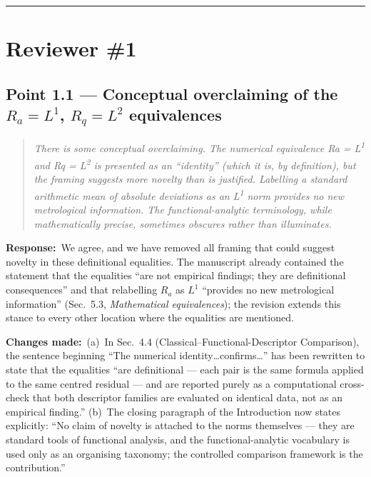 \documentclass[11pt,a4paper]{article}
\newenvironment{reviewercomment}%
{\par\medskip\noindent\begin{quotation}\itshape\color{black!70}}%
{\end{quotation}\medskip}
\newcommand{\response}{\par\noindent\textbf{Response:}\ }
\newcommand{\changes}{\par\noindent\textbf{Changes made:}\ }
\begin{document}
\bigskip
\hrule
\section*{Reviewer \#1}

\subsection*{Point 1.1 --- Conceptual overclaiming of the $R_a = L^1$, $R_q = L^2$ equivalences}
\begin{reviewercomment}
There is some conceptual overclaiming. The numerical equivalence Ra = L\textsuperscript{1} and Rq = L\textsuperscript{2} is presented as an ``identity'' (which it is, by definition), but the framing suggests more novelty than is justified. Labelling a standard arithmetic mean of absolute deviations as an L\textsuperscript{1} norm provides no new metrological information. The functional-analytic terminology, while mathematically precise, sometimes obscures rather than illuminates.
\end{reviewercomment}
\response We agree, and we have removed all framing that could suggest novelty in these definitional equalities. The manuscript already contained the statement that the equalities ``are not empirical findings; they are definitional consequences'' and that relabelling $R_a$ as $L^1$ ``provides no new metrological information'' (Sec.~5.3, \emph{Mathematical equivalences}); the revision extends this stance to every other location where the equalities are mentioned.
\changes (a)~In Sec.~4.4 (Classical--Functional-Descriptor Comparison), the sentence beginning ``The numerical identity\ldots confirms\ldots'' has been rewritten to state that the equalities ``are definitional --- each pair is the same formula applied to the same centred residual --- and are reported purely as a computational cross-check that both descriptor families are evaluated on identical data, not as an empirical finding.'' (b)~The closing paragraph of the Introduction now states explicitly: ``No claim of novelty is attached to the norms themselves --- they are standard tools of functional analysis, and the functional-analytic vocabulary is used only as an organising taxonomy; the controlled comparison framework is the contribution.''
\end{document}
